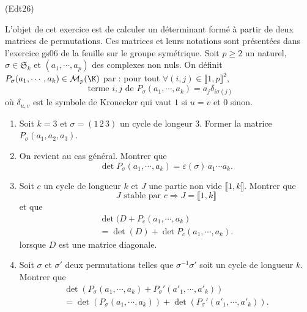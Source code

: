 \begin{tiny}(Edt26)\end{tiny} L'objet de cet exercice est de calculer un déterminant formé à partir de deux matrices de permutations. Ces matrices et leurs notations sont présentées dans l'exercice gs06 de la feuille sur le groupe symétrique.\newline
Soit $p\geq 2$ un naturel, $\sigma \in \mathfrak{S}_k$ et $(a_1, \cdots, a_p)$ des complexes non nuls.\newline
On définit $P_\sigma (a_1,\cdots,a_k)\in \mathcal M_p(\K)$ par : pour tout $\forall (i,j)\in \llbracket 1,p \rrbracket^2$,
\begin{displaymath}
\text{ terme $i,j$ de } P_\sigma(a_1,\cdots,a_k) = a_j \delta_{i \sigma(j)}
\end{displaymath}
où $\delta_{u,v}$ est le symbole de Kronecker qui vaut $1$ si $u=v$ et $0$ sinon.
\begin{enumerate}
  \item Soit $k = 3$ et $\sigma = (1 \, 2 \, 3)$ un cycle de longeur 3. Former la matrice $P_\sigma(a_1,a_2,a_3)$.
  \item On revient au cas général. Montrer que
\begin{displaymath}
  \det P_\sigma(a_1,\cdots,a_k) = \varepsilon(\sigma)\, a_1\cdots a_k.
\end{displaymath}
  \item Soit $c$ un cycle de longueur $k$ et $J$ une partie non vide $\llbracket 1,k \rrbracket$. Montrer que
\begin{displaymath}
  J \text{ stable par } c \Rightarrow J = \llbracket 1,k \rrbracket
\end{displaymath}
et que 
\begin{multline*}
  \det( D + P_c(a_1,\cdots,a_k) \\
  = \det(D) + \det P_c(a_1,\cdots,a_k).
\end{multline*}
lorsque $D$ est une matrice diagonale.
  \item Soit $\sigma$ et $\sigma'$ deux permutations telles que $\sigma^{-1} \sigma'$ soit un cycle de longueur $k$. Montrer que
\begin{multline*}
  \det\left( P_\sigma(a_1,\cdots,a_k) + P_\sigma'(a'_1,\cdots,a'_k)\right) \\
  = 
  \det\left( P_\sigma(a_1,\cdots,a_k) \right)
  +\det\left( P_\sigma'(a'_1,\cdots,a'_k)\right).
\end{multline*}

\end{enumerate}


